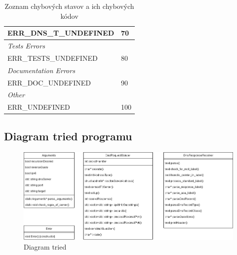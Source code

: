 \documentclass[a4paper, 11pt]{article}
\begin{document}
\begin{table}[h]
\begin{tabularx}{\textwidth}{|X|l|}
		ERR\_DNS\_T\_UNDEFINED                 & 70                  \\ \hline
		\multicolumn{2}{|X|}{\textit{Tests Errors}}                    \\ \hline
		ERR\_TESTS\_UNDEFINED                  & 80                  \\ \hline
		\multicolumn{2}{|X|}{\textit{Documentation Errors}}            \\ \hline
		ERR\_DOC\_UNDEFINED                    & 90                  \\ \hline
		\multicolumn{2}{|X|}{\textit{Other}}                           \\ \hline
		ERR\_UNDEFINED                         & 100                 \\ \hline
		\end{tabularx}
		\caption{Zoznam chybových stavov a ich chybových kódov}
		\label{tab:errors}
	\end{table}
		
	\newpage
	\subsection{Diagram tried programu}
	\label{subsection:res_classDiagram}
	\begin{figure}[ht]
		\centering
		\includegraphics[width=1 \linewidth]{res/classDiagram.png}

		\caption{Diagram tried}
	\end{figure}
\end{document}

